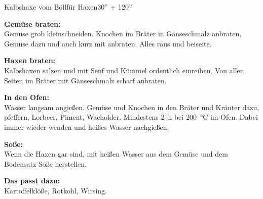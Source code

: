 \begin{MyRecipe}{Kalbshaxe vom Böll}{für  Haxen}{30'' + 120''}


\textbf{Gemüse braten:}\\
Gemüse grob kleinschneiden. Knochen im Bräter in Gänseschmalz anbraten, Gemüse dazu und auch kurz mit anbraten. Alles raus und beiseite.\par\bigskip


\textbf{Haxen braten:}\\
Kalbshaxen salzen und mit Senf und Kümmel ordentlich einreiben. Von allen Seiten im Bräter mit Gänseschmalz scharf anbraten.\par\bigskip


\textbf{In den Ofen:}\\
Wasser langsam angießen. Gemüse und Knochen in den Bräter und Kräuter dazu, pfeffern, Lorbeer, Piment, Wacholder. Mindestens \SI{2}{\hour} bei \SI{200}{\degreeCelsius} im Ofen. Dabei immer wieder wenden und
heißes Wasser nachgießen.\par\bigskip

\textbf{Soße:}\\
Wenn die Haxen gar sind, mit heißen Wasser aus dem Gemüse und dem Bodensatz Soße herstellen.\par\bigskip

\textbf{Das passt dazu:}\\
Kartoffelklöße, Rotkohl, Wirsing.
	

			
\end{MyRecipe}
